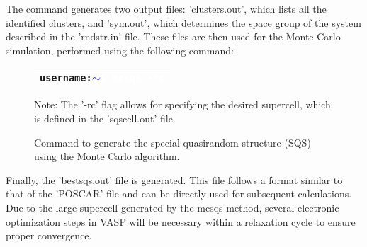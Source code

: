 The command generates two output files: 'clusters.out', which lists all the identified clusters, and 'sym.out', which determines the space group of the system described in the 'rndstr.in' file. These files are then used for the Monte Carlo simulation, performed using the following command:

\begin{figure}[H]
	\begin{threeparttable}
		\begin{tabular}{>{\columncolor{black}}p{\linewidth}}
			\texttt{\textcolor{green!70!black}{username:\textcolor{blue}{$\sim$}}\textcolor{white}{\$} \textcolor{white}{mcsqs -rc}} \\ \hline
		\end{tabular}
		\centering
		\caption{Command to generate the special quasirandom structure (SQS) using the Monte Carlo algorithm.}
		\label{fig:4.0}
		\begin{tablenotes}
			\footnotesize 
			\item Note: The '-rc' flag allows for specifying the desired supercell, which is defined in the 'sqscell.out' file.  
		\end{tablenotes}
	\end{threeparttable}
\end{figure}


Finally, the 'bestsqs.out' file is generated. This file follows a format similar to that of the 'POSCAR' file and can be directly used for subsequent calculations. Due to the large supercell generated by the mcsqs method, several electronic optimization steps in VASP will be necessary within a relaxation cycle to ensure proper convergence.

